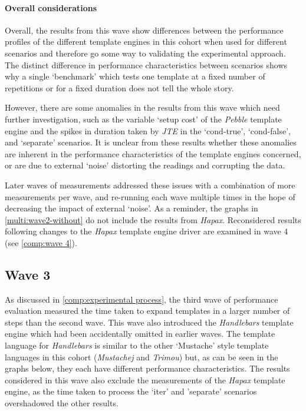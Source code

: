 \paragraph{Overall considerations}

Overall, the results from this wave show differences between the performance profiles of the different template engines in this cohort when used for different scenarios and therefore go some way to validating the experimental approach. The distinct difference in performance characteristics between scenarios shows why a single `benchmark' which tests one template at a fixed number of repetitions or for a fixed duration \citep{Hasselbring2021} does not tell the whole story.

However, there are some anomalies in the results from this wave which need further investigation, such as the variable `setup cost' of the \emph{Pebble} template engine and the spikes in duration taken by \emph{JTE} in the `cond-true', `cond-false', and `separate' scenarios. It is unclear from these results whether these anomalies are inherent in the performance characteristics of the template engines concerned, or are due to external `noise' distorting the readings and corrupting the data.

Later waves of measurements addressed these issues with a combination of more measurements per wave, and re-running each wave multiple times in the hope of decreasing the impact of external `noise'. As a reminder, the graphs in \autoref{multi:wave2-without} do not include the results from \emph{Hapax}. Reconsidered results following changes to the \emph{Hapax} template engine driver are examined in wave 4 (see \autoref{comp:wave 4}).

\subsection{Wave 3}
\label{comp:wave 3}

As discussed in \autoref{comp:experimental process}, the third wave of performance evaluation measured the time taken to expand templates in a larger number of steps than the second wave. This wave also introduced the \emph{Handlebars} template engine which had been accidentally omitted in earlier waves. The template language for \emph{Handlebars} is similar to the other `Mustache' style template languages in this cohort (\emph{Mustachej} and \emph{Trimou}) but, as can be seen in the graphs below, they each have different performance characteristics. The results considered in this wave also exclude the measurements of the \emph{Hapax} template engine, as the time taken to process the `iter' and 'separate' scenarios  overshadowed the other results.

